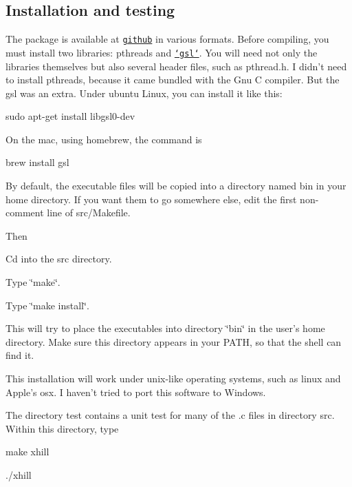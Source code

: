 \subsection*{Installation and testing}

The package is available at \href{github.com/alanrogers/ldpsiz}{\tt github} in various formats. Before compiling, you must install two libraries\+: {\ttfamily pthreads} and \href{http://www.gnu.org/software/gsl}{\tt `gsl`}. You will need not only the libraries themselves but also several header files, such as {\ttfamily pthread.\+h}. I didn't need to install {\ttfamily pthreads}, because it came bundled with the Gnu C compiler. But the gsl was an extra. Under ubuntu Linux, you can install it like this\+: \begin{DoxyVerb}sudo apt-get install libgsl0-dev
\end{DoxyVerb}


On the mac, using homebrew, the command is \begin{DoxyVerb}brew install gsl
\end{DoxyVerb}


By default, the executable files will be copied into a directory named {\ttfamily bin} in your home directory. If you want them to go somewhere else, edit the first non-\/comment line of src/\+Makefile.

Then


\begin{DoxyEnumerate}
\item Cd into the src directory.
\item Type \char`\"{}make\char`\"{}.
\item Type \char`\"{}make install\char`\"{}.
\end{DoxyEnumerate}

This will try to place the executables into directory \char`\"{}bin\char`\"{} in the user's home directory. Make sure this directory appears in your P\+A\+T\+H, so that the shell can find it.

This installation will work under unix-\/like operating systems, such as linux and Apple's osx. I haven't tried to port this software to Windows.

The directory {\ttfamily test} contains a unit test for many of the .c files in directory {\ttfamily src}. Within this directory, type


\begin{DoxyEnumerate}
\item make xhill
\item ./xhill
\end{DoxyEnumerate}

